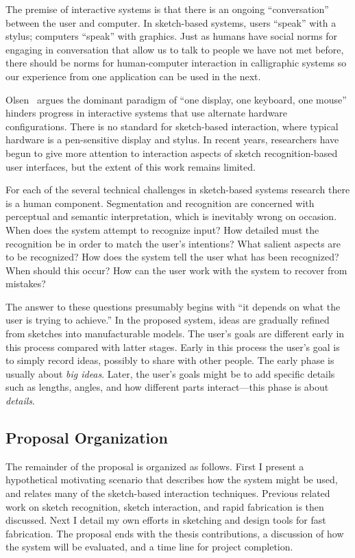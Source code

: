 \documentclass[12pt]{article}
\begin{document}
The premise of interactive systems is that there is an ongoing
``conversation'' between the user and computer. In sketch-based
systems, users ``speak'' with a stylus; computers ``speak'' with
graphics. Just as humans have social norms for engaging in
conversation that allow us to talk to people we have not met before,
there should be norms for human-computer interaction in calligraphic
systems so our experience from one application can be used in the
next.

Olsen~\cite{olsen-ui-research} argues the dominant paradigm of ``one
display, one keyboard, one mouse'' hinders progress in interactive
systems that use alternate hardware configurations. There is no
standard for sketch-based interaction, where typical hardware is a
pen-sensitive display and stylus. In recent years, researchers have
begun to give more attention to interaction aspects of sketch
recognition-based user interfaces, but the extent of this work remains
limited.

For each of the several technical challenges in sketch-based systems
research there is a human component. Segmentation and recognition are
concerned with perceptual and semantic interpretation, which is
inevitably wrong on occasion. When does the system attempt to
recognize input? How detailed must the recognition be in order to
match the user's intentions? What salient aspects are to be
recognized? How does the system tell the user what has been
recognized? When should this occur? How can the user work with the
system to recover from mistakes?

The answer to these questions presumably begins with ``it depends on
what the user is trying to achieve.'' In the proposed system, ideas
are gradually refined from sketches into manufacturable models. The
user's goals are different early in this process compared with latter
stages. Early in this process the user's goal is to simply record
ideas, possibly to share with other people. The early phase is usually
about \textit{big ideas}. Later, the user's goals might be to add
specific details such as lengths, angles, and how different parts
interact---this phase is about \textit{details}.

\subsection{Proposal Organization}

The remainder of the proposal is organized as follows. First I present
a hypothetical motivating scenario that describes how the system might
be used, and relates many of the sketch-based interaction
techniques. Previous related work on sketch recognition, sketch
interaction, and rapid fabrication is then discussed. Next I detail my
own efforts in sketching and design tools for fast fabrication. The
proposal ends with the thesis contributions, a discussion of how the
system will be evaluated, and a time line for project completion.
\end{document}
